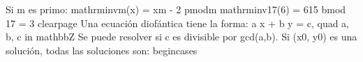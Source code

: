{}Si \markdownRendererDollarSign{}m\markdownRendererDollarSign{} es primo:\markdownRendererParagraphSeparator
{}\markdownRendererDollarSign{}\markdownRendererDollarSign{}\markdownRendererSoftLineBreak
{}\markdownRendererBackslash{}mathrm\markdownRendererLeftBrace{}inv\markdownRendererRightBrace{}\markdownRendererUnderscore{}m(x) = x\markdownRendererCircumflex{}\markdownRendererLeftBrace{}m - 2\markdownRendererRightBrace{} \markdownRendererBackslash{}pmod\markdownRendererLeftBrace{}m\markdownRendererRightBrace{}\markdownRendererSoftLineBreak
{}\markdownRendererDollarSign{}\markdownRendererDollarSign{}\markdownRendererParagraphSeparator
{} \markdownRendererDollarSign{}\markdownRendererBackslash{}mathrm\markdownRendererLeftBrace{}inv\markdownRendererRightBrace{}\markdownRendererUnderscore{}\markdownRendererLeftBrace{}17\markdownRendererRightBrace{}(6) = 6\markdownRendererCircumflex{}\markdownRendererLeftBrace{}15\markdownRendererRightBrace{} \markdownRendererBackslash{}bmod 17 = 3\markdownRendererDollarSign{}\markdownRendererParagraphSeparator
{}\markdownRendererInterblockSeparator
{}\markdownRendererDollarSign{}\markdownRendererBackslash{}clearpage\markdownRendererDollarSign{}\markdownRendererInterblockSeparator
{}
\markdownRendererSectionEnd \markdownRendererSectionBegin
{}\markdownRendererInterblockSeparator
{}Una ecuación diofántica tiene la forma:\markdownRendererParagraphSeparator
{}\markdownRendererDollarSign{}\markdownRendererDollarSign{}\markdownRendererSoftLineBreak
{}a x + b y = c, \markdownRendererBackslash{}quad a, b, c \markdownRendererBackslash{}in \markdownRendererBackslash{}mathbb\markdownRendererLeftBrace{}Z\markdownRendererRightBrace{}\markdownRendererSoftLineBreak
{}\markdownRendererDollarSign{}\markdownRendererDollarSign{}\markdownRendererParagraphSeparator
{}Se puede resolver si \markdownRendererDollarSign{}c\markdownRendererDollarSign{} es divisible por \markdownRendererDollarSign{}\markdownRendererBackslash{}gcd(a,b)\markdownRendererDollarSign{}.\markdownRendererHardLineBreak
{}Si \markdownRendererDollarSign{}(x\markdownRendererUnderscore{}0, y\markdownRendererUnderscore{}0)\markdownRendererDollarSign{} es una solución, todas las soluciones son:\markdownRendererParagraphSeparator
{}\markdownRendererDollarSign{}\markdownRendererDollarSign{}\markdownRendererSoftLineBreak
{}\markdownRendererBackslash{}begin\markdownRendererLeftBrace{}cases\markdownRendererRightBrace{}\markdownRendererSoftLineBreak
